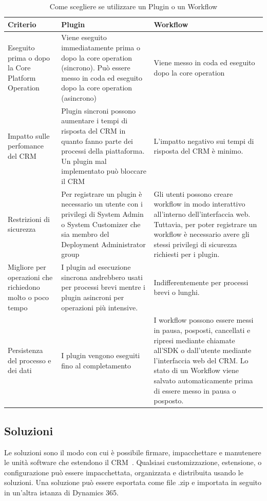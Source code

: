 \begin{table}[ht]
  \centering
  \begin{tabular}{p{}p{}p{}}
    \toprule
      \textbf{Criterio} & \textbf{Plugin} & \textbf{Workflow} \\
    \midrule
    Eseguito prima o dopo la Core Platform Operation & Viene eseguito immediatamente prima o dopo la core operation (sincrono). Può essere messo in coda ed eseguito dopo la core operation (asincrono) & Viene messo in coda ed eseguito dopo la core operation \\
    \midrule
    Impatto sulle perfomance del CRM & Plugin sincroni possono aumentare i tempi di risposta del CRM in quanto fanno parte dei processi della piattaforma. Un plugin mal implementato può bloccare il CRM & L'impatto negativo sui tempi di risposta del CRM è minimo. \\
    \midrule
    Restrizioni di sicurezza & Per registrare un plugin è necessario un utente con i privilegi di System Admin o System Customizer che sia membro del Deployment Administrator group & Gli utenti possono creare workflow in modo interattivo all'interno dell'interfaccia web. Tuttavia, per poter registrare un workflow è necessario avere gli stessi privilegi di sicurezza richiesti per i plugin. \\
    \midrule
    Migliore per operazioni che richiedono molto o poco tempo & I plugin ad esecuzione sincrona andrebbero usati per processi brevi mentre i plugin asincroni per operazioni più intensive. & Indifferentemente per processi brevi o lunghi. \\
    \midrule
    Persistenza del processo e dei dati & I plugin vengono eseguiti fino al completamento & I workflow possono essere messi in pausa, posposti, cancellati e ripresi mediante chiamate all'SDK o dall'utente mediante l'interfaccia web del CRM. Lo stato di un Workflow viene salvato automaticamente prima di essere messo in pausa o posposto. \\
    \bottomrule
  \end{tabular}
  \caption{Come scegliere se utilizzare un Plugin o un Workflow}
  \label{table:pluginVsWorkflow}
\end{table}

\subsection{Soluzioni}
Le soluzioni sono il modo con cui è possibile firmare, impacchettare e manutenere le unità software che estendono il CRM~\cite{Solutions}. Qualsiasi customizzazione, estensione, o configurazione può essere impacchettata, organizzata e distribuita usando le soluzioni. Una soluzione può essere esportata come file .zip e importata in seguito in un'altra istanza di Dynamics 365. 
